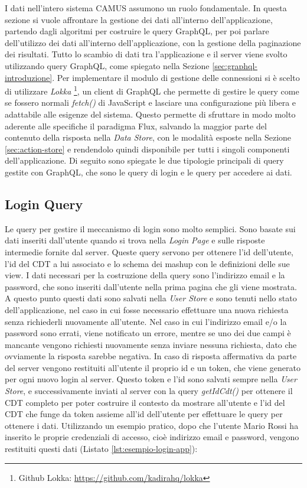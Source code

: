 I dati nell'intero sistema CAMUS assumono un ruolo fondamentale. In questa sezione si vuole affrontare la gestione dei dati all'interno dell'applicazione, partendo dagli algoritmi per costruire le query GraphQL, per poi parlare dell'utilizzo dei dati all'interno dell'applicazione, con la gestione della paginazione dei risultati.
Tutto lo scambio di dati tra l'applicazione e il server viene svolto utilizzando query GraphQL, come spiegato nella Sezione \ref{sec:graphql-introduzione}. Per implementare il modulo di gestione delle connessioni si è scelto di utilizzare \emph{Lokka} \footnote{Github Lokka: \url{https://github.com/kadirahq/lokka}}, un client di GraphQL che permette di gestire le query come se fossero normali \emph{fetch()} di JavaScript e lasciare una configurazione più libera e adattabile alle esigenze del sistema. Questo permette di sfruttare in modo molto aderente alle specifiche il paradigma Flux, salvando la maggior parte del contenuto della risposta nella \emph{Data Store}, con le modalità esposte nella Sezione \ref{sec:action-store} e rendendolo quindi disponibile per tutti i singoli componenti dell'applicazione. Di seguito sono spiegate le due tipologie principali di query gestite con GraphQL, che sono le query di login e le query per accedere ai dati.

\subsection{Login Query}
Le query per gestire il meccanismo di login sono molto semplici. Sono basate sui dati inseriti dall'utente quando si trova nella \emph{Login Page} e sulle risposte intermedie fornite dal server. Queste query servono per ottenere l'id dell'utente, l'id del CDT a lui associato e lo schema dei mashup con le definizioni delle sue view.
I dati necessari per la costruzione della query sono l'indirizzo email e la password, che sono inseriti dall'utente nella prima pagina che gli viene mostrata. A questo punto questi dati sono salvati nella \emph{User Store} e sono tenuti nello stato dell'applicazione, nel caso in cui fosse necessario effettuare una nuova richiesta senza richiederli nuovamente all'utente. Nel caso in cui l'indirizzo email e/o la password sono errati, viene notificato un errore, mentre se uno dei due campi è mancante vengono richiesti nuovamente senza inviare nessuna richiesta, dato che ovviamente la risposta sarebbe negativa.
In caso di risposta affermativa da parte del server vengono restituiti all'utente il proprio id e un token, che viene generato per ogni nuovo login al server. Questo token e l'id sono salvati sempre nella \emph{User Store}, e successivamente inviati al server con la query \emph{getIdCdt()} per ottenere il CDT completo per poter costruire il contesto da mostrare all'utente e l'id del CDT che funge da token assieme all'id dell'utente per effettuare le query per ottenere i dati.
Utilizzando un esempio pratico, dopo che l'utente Mario Rossi ha inserito le proprie credenziali di accesso, cioè indirizzo email e password, vengono restituiti questi dati (Listato \ref{lst:esempio-login-app}): 

